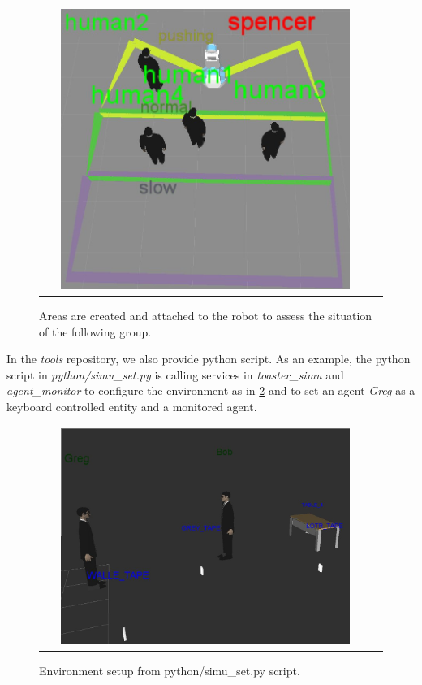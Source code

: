 \documentclass[a4paper]{article}
\begin{document}
 \begin{figure}[ht!]
 \centering
 \begin{tabular}{cc}
  \includegraphics[width=0.9\textwidth]{img/toaster_spencer.jpg}
 \end{tabular}
 \caption{Areas are created and attached to the robot to assess the situation of the following group.}
 \label{fig:areaspencer}
 \end{figure}

In the \textit{tools} repository, we also provide python script.
As an example, the python script in \textit{python/simu\_set.py} is calling services in \textit{toaster\_simu} and \textit{agent\_monitor} to configure the environment as in \ref{fig:areaspencer} and to set an agent \textit{Greg} as a keyboard controlled entity and a monitored agent.

 \begin{figure}[ht!]
 \centering
 \begin{tabular}{cc}
  \includegraphics[width=0.9\textwidth]{img/pythonToast.jpg}
 \end{tabular}
 \caption{Environment setup from python/simu\_set.py script.}
 \label{fig:areaspencer}
 \end{figure}
\end{document}
